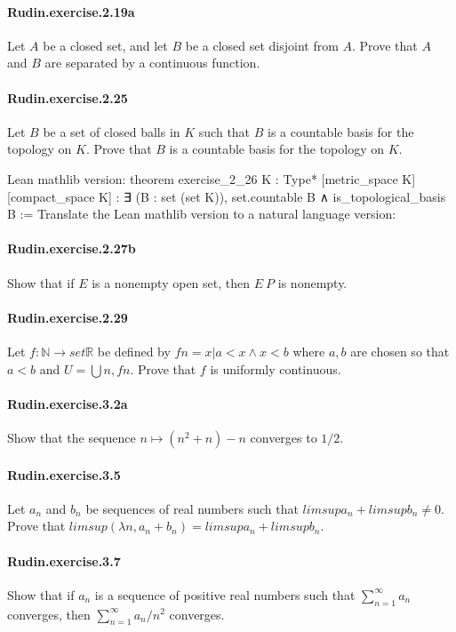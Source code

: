 \documentclass{article}
\begin{document}
\paragraph{Rudin.exercise.2.19a} Let $A$ be a closed set, and let $B$ be a closed set disjoint from $A$. Prove that $A$ and $B$ are separated by a continuous function.

\paragraph{Rudin.exercise.2.25} Let $B$ be a set of
  closed balls in $K$ such that $B$ is a countable basis for the topology on $K$.
  Prove that $B$ is a countable basis for the topology on $K$.

Lean mathlib version:
theorem exercise_2_26 {K : Type*} [metric_space K] [compact_space K] :
  ∃ (B : set (set K)), set.countable B ∧ is_topological_basis B :=
Translate the Lean mathlib version to a natural language version: 

\paragraph{Rudin.exercise.2.27b} Show that if $E$ is a nonempty open set, then $E \ P$ is nonempty.

\paragraph{Rudin.exercise.2.29} Let $f : ℕ → set ℝ$ be defined by $f n = {x | a < x ∧ x < b}$ where $a, b$ are chosen so that $a < b$ and $U = ⋃ n, f n$. Prove that $f$ is uniformly continuous.

\paragraph{Rudin.exercise.3.2a} Show that the sequence $n \mapsto (n^2 + n) - n$ converges to $1/2$.

\paragraph{Rudin.exercise.3.5} Let $a_n$ and $b_n$ be sequences of real numbers such that $limsup a_n + limsup b_n ≠ 0$. Prove that $limsup (λ n, a_n + b_n) = limsup a_n + limsup b_n$.

\paragraph{Rudin.exercise.3.7} Show that if $a_n$ is a sequence of positive real numbers such that $\sum_{n=1}^\infty a_n$ converges, then $\sum_{n=1}^\infty a_n / n^2$ converges.
\end{document}
